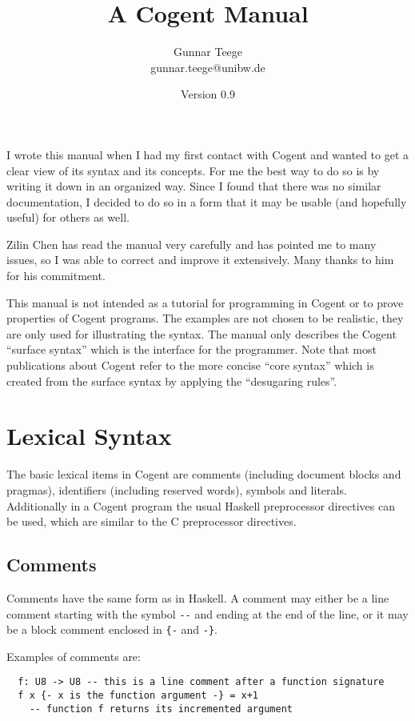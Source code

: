 \documentclass[a4paper]{report}
\newcommand{\code}[1]{\textnormal{\texttt{#1}}}
\newcommand{\cogent}{Cogent\xspace}
\begin{document}
\title{A \cogent Manual}
\author{Gunnar Teege\\ gunnar.teege{@}unibw.de}
\date{Version 0.9}

\maketitle

I wrote this manual when I had my first contact with \cogent and wanted to get a clear view of its syntax and its concepts.
For me the best way to do so is by writing it down in an organized way. Since I found that there was no similar documentation,
I decided to do so in a form that it may be usable (and hopefully useful) for others as well.

Zilin Chen has read the manual very carefully and has pointed me to many issues, so I was able to correct and improve it 
extensively. Many thanks to him for his commitment.

This manual is not intended as a tutorial for programming in \cogent or to prove properties of \cogent programs. The examples
are not chosen to be realistic, they are only used for illustrating the syntax. The manual only describes the \cogent
``surface syntax'' which is the interface for the programmer. Note that most publications about \cogent refer to the more
concise ``core syntax'' which is created from the surface syntax by applying the ``desugaring rules''.

\chapter{Lexical Syntax}


The basic lexical items in \cogent are comments (including document blocks and pragmas), identifiers (including reserved words), symbols and literals.
Additionally in a \cogent program the usual Haskell preprocessor directives can be used, which are similar to the C preprocessor directives.


\section{Comments}

Comments have the same form as in Haskell. A comment may either be a line comment
starting with the symbol \code{-}\code{-} and ending at the end of the line, or it may
be a block comment enclosed in \code{\{-} and \code{-\}}.

Examples of comments are:
\begin{verbatim}
  f: U8 -> U8 -- this is a line comment after a function signature
  f x {- x is the function argument -} = x+1
    -- function f returns its incremented argument
\end{verbatim}
\end{document}
